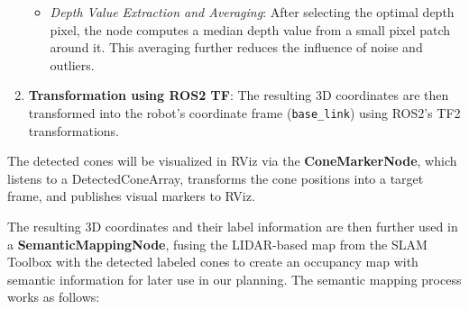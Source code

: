 \begin{enumerate}
\begin{itemize}
        \item \textit{Depth Value Extraction and Averaging}: After selecting the optimal depth pixel, the node computes a median depth value from a small pixel patch around it. This averaging further reduces the influence of noise and outliers.
        
    \end{itemize}

    \item \textbf{Transformation using ROS2 TF}: The resulting 3D coordinates are then transformed into the robot's coordinate frame (\texttt{base\_link}) using ROS2's TF2 transformations.
\end{enumerate}

The detected cones will be visualized in RViz via the \textbf{ConeMarkerNode}, which listens to a DetectedConeArray, transforms the cone positions into a target frame, and publishes visual markers to RViz.\\
\newline

The resulting 3D coordinates and their label information are then further used in a \textbf{SemanticMappingNode}, fusing the LIDAR-based map from the SLAM Toolbox with the detected labeled cones to create an occupancy map with semantic information for later use in our planning. The semantic mapping process works as follows:

